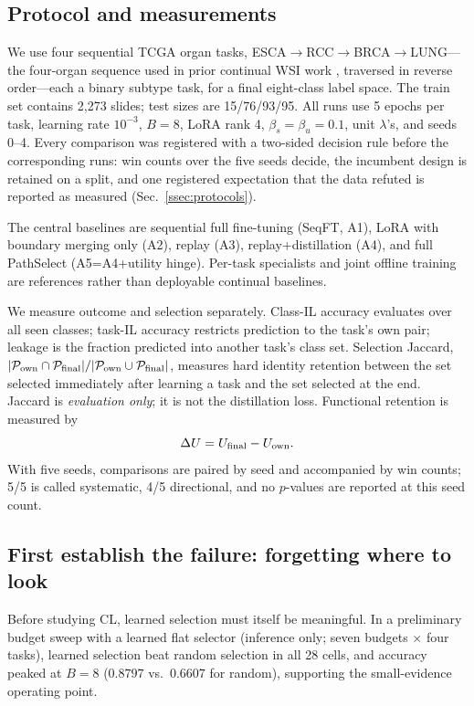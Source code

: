 \documentclass{article}
\newcommand{\Psel}{\mathcal{P}}
\begin{document}
\subsection{Protocol and measurements}

We use four sequential TCGA organ tasks, ESCA$\rightarrow$RCC$\rightarrow$BRCA$\rightarrow$LUNG---the four-organ sequence used in prior continual WSI work \cite{huang2023conslide,gou2025qpmil}, traversed in reverse order---each a binary subtype task, for a final eight-class label space.
The train set contains 2,273 slides; test sizes are 15/76/93/95.
All runs use 5 epochs per task, learning rate $10^{-3}$, $B=8$, LoRA rank 4, $\beta_s{=}\beta_u{=}0.1$, unit $\lambda$'s, and seeds 0--4. Every comparison was registered with a two-sided decision rule before the corresponding runs: win counts over the five seeds decide, the incumbent design is retained on a split, and one registered expectation that the data refuted is reported as measured (Sec.~\ref{ssec:protocols}).

The central baselines are sequential full fine-tuning (SeqFT, A1), LoRA with boundary merging only (A2), replay (A3), replay+distillation (A4), and full PathSelect (A5=A4+utility hinge).
Per-task specialists and joint offline training are references rather than deployable continual baselines.

We measure outcome and selection separately.
Class-IL accuracy evaluates over all seen classes; task-IL accuracy restricts prediction to the task's own pair; leakage is the fraction predicted into another task's class set.
Selection Jaccard, $|\Psel_{\rm own}\cap\Psel_{\rm final}|/|\Psel_{\rm own}\cup\Psel_{\rm final}|$, measures hard identity retention between the set selected immediately after learning a task and the set selected at the end.
Jaccard is \emph{evaluation only}; it is not the distillation loss.
Functional retention is measured by
\[
\Delta U=U_{\rm final}-U_{\rm own}.
\]
With five seeds, comparisons are paired by seed and accompanied by win counts; 5/5 is called systematic, 4/5 directional, and no $p$-values are reported at this seed count.

\subsection{First establish the failure: forgetting where to look}

Before studying CL, learned selection must itself be meaningful.
In a preliminary budget sweep with a learned flat selector (inference only; seven budgets $\times$ four tasks), learned selection beat random selection in all 28 cells, and accuracy peaked at $B=8$ ($0.8797$ vs.\ $0.6607$ for random), supporting the small-evidence operating point.
\end{document}
